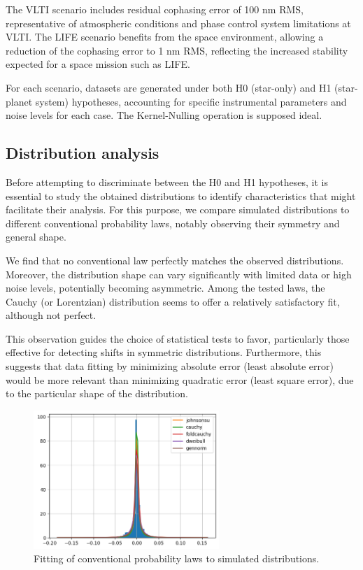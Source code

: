 \documentclass{article}
\begin{document}
The VLTI scenario includes residual cophasing error of 100 nm RMS, representative of atmospheric conditions and phase control system limitations at VLTI. The LIFE scenario benefits from the space environment, allowing a reduction of the cophasing error to 1 nm RMS, reflecting the increased stability expected for a space mission such as LIFE.

For each scenario, datasets are generated under both H0 (star-only) and H1 (star-planet system) hypotheses, accounting for specific instrumental parameters and noise levels for each case. The Kernel-Nulling operation is supposed ideal.

\subsection{Distribution analysis}

Before attempting to discriminate between the H0 and H1 hypotheses, it is essential to study the obtained distributions to identify characteristics that might facilitate their analysis. For this purpose, we compare simulated distributions to different conventional probability laws, notably observing their symmetry and general shape.

We find that no conventional law perfectly matches the observed distributions. Moreover, the distribution shape can vary significantly with limited data or high noise levels, potentially becoming asymmetric. Among the tested laws, the Cauchy (or Lorentzian) distribution seems to offer a relatively satisfactory fit, although not perfect.

This observation guides the choice of statistical tests to favor, particularly those effective for detecting shifts in symmetric distributions. Furthermore, this suggests that data fitting by minimizing absolute error (least absolute error) would be more relevant than minimizing quadratic error (least square error), due to the particular shape of the distribution.

\begin{figure}[H]
\centering
\includegraphics[width=7cm]{img/model_fitting.png}
\caption{Fitting of conventional probability laws to simulated distributions.}
\label{fig:model_fitting}
\end{figure}
\end{document}
